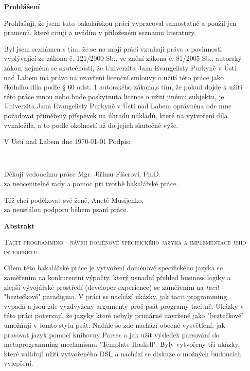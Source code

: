 \documentclass[male,czech]{kithesis}
\newcommand{\TITULcz}{Tacit programming - návrh doménově specifického jazyka a implementace jeho interpretu} %
\begin{document}
\cleardoublepage
\thispagestyle{empty}

\textbf{Prohlášení}

Prohlašuji, že jsem tuto bakalářskou práci vypracoval samostatně a použil
jen pramenů, které cituji a uvádím v přiloženém seznamu literatury.

\vspace{1em}
Byl jsem seznámen s tím, že se na moji práci vztahují práva a povinnosti vyplývající ze zákona č. 121/2000 Sb., ve znění zákona č. 81/2005 Sb., autorský zákon, zejména se skutečností, že Univerzita Jana Evangelisty Purkyně v Ústí nad Labem má právo na uzavření licenční smlouvy o užití této práce jako školního díla podle § 60 odst. 1 autorského zákona,s tím, že pokud dojde k užití této práce mnou nebo bude poskytnuta licence o užití jinému
subjektu, je Univerzita Jana Evangelisty Purkyně v Ústí nad Labem oprávněna ode mne požadovat přiměřený příspěvek na úhradu nákladů, které na vytvoření díla vynaložila, a to podle okolností až do jejich skutečné výše.

\vspace{1em}
V Ústí nad Labem dne \today \hspace{0.3\textwidth} Podpis:


\clearpage
\thispagestyle{empty}
~\vfill

\begin{flushright}
  Děkuji vedoucímu práce Mgr. Jiřímu Fišerovi, Ph.D.\\ za neocenitelné rady a pomoc při tvorbě bakalářské práce.

  Též chci poděkovat své ženě, Anetě Musijenko, \\ za neustálou podporu během psaní práce.
\end{flushright}

\cleardoublepage
\thispagestyle{empty}

\textbf{\textsf{Abstrakt}}

\textsc{\TITULcz}

Cílem této bakalářské práce je vytvoření doménově specifického jazyka se zaměřením na konkurentní výpočty, 
který usnadní přehled business logiky a zlepší vývojářské prostředí (developer experience) se zaměřením na \textit{tacit} - "beztečkové" paradigma.
V práci se nachází ukázky, 
jak tacit programming vypadá a 
jsou zde vyzdvyženy argumenty proč psát programy tacitně.
Ukázky v této práci potvrzují, 
že jazyky které nebyly primárně navržené jako "beztečkové" 
umožňují v tomto stylu psát.
Nadále se zde nachází obecné vysvětlení, 
jak prasovat jazyk pomocí knihovny Parsec a
jak užít výsledek parsování do metaprogramming mechanismu "Template Haskell".
Byly vytvořeny tři ukázky, 
které validují užití vytvořeného DSL a
nachází se diskuze o možných budoucích vylepšení.
\end{document}
